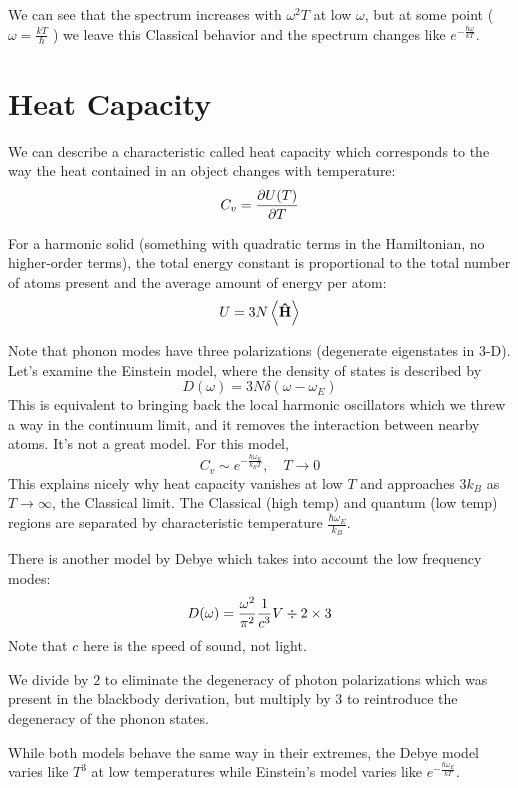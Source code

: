 \documentclass[a4paper,twoside,master.tex]{subfiles}
\begin{document}
We can see that the spectrum increases with $ \omega^2 T $ at low $ \omega $, but at some point ($\omega = \frac{kT}{\hbar}$ ) we leave this Classical behavior and the spectrum changes like $ e^{-\frac{\hbar \omega}{kT}} $.

\section{Heat Capacity}
\label{sec:heat_capacity}

We can describe a characteristic called heat capacity which corresponds to the way the heat contained in an object changes with temperature:
\begin{equation}
    C_v = \pdv{U(T)}{T}
\end{equation}

For a harmonic solid (something with quadratic terms in the Hamiltonian, no higher-order terms), the total energy constant is proportional to the total number of atoms present and the average amount of energy per atom:
\begin{equation}
    U = 3N\ev{\vu{H}}
\end{equation}

Note that phonon modes have three polarizations (degenerate eigenstates in 3-D). Let's examine the Einstein model, where the density of states is described by
\begin{equation}
    D(\omega) = 3N \delta(\omega - \omega_E)
\end{equation}
This is equivalent to bringing back the local harmonic oscillators which we threw a way in the continuum limit, and it removes the interaction between nearby atoms. It's not a great model. For this model,
\begin{equation}
    C_v \sim e^{- \frac{\hbar \omega_E}{k_B T}}, \quad T \to 0 
\end{equation}
This explains nicely why heat capacity vanishes at low $ T $ and approaches $ 3 k_B $ as $ T \to \infty $, the Classical limit. The Classical (high temp) and quantum (low temp) regions are separated by characteristic temperature $ \frac{\hbar \omega_E}{k_B} $.

There is another model by Debye which takes into account the low frequency modes:
\begin{equation}
    D(\omega) = \frac{\omega^2}{\pi^2} \frac{1}{c^3} V \divisionsymbol 2 \times 3
\end{equation}
Note that $ c $ here is the speed of sound, not light.

We divide by $ 2 $ to eliminate the degeneracy of photon polarizations which was present in the blackbody derivation, but multiply by $ 3 $ to reintroduce the degeneracy of the phonon states.

While both models behave the same way in their extremes, the Debye model varies like $ T^3 $ at low temperatures while Einstein's model varies like  $ e^{- \frac{\hbar \omega_E}{kT}} $.
\end{document}
